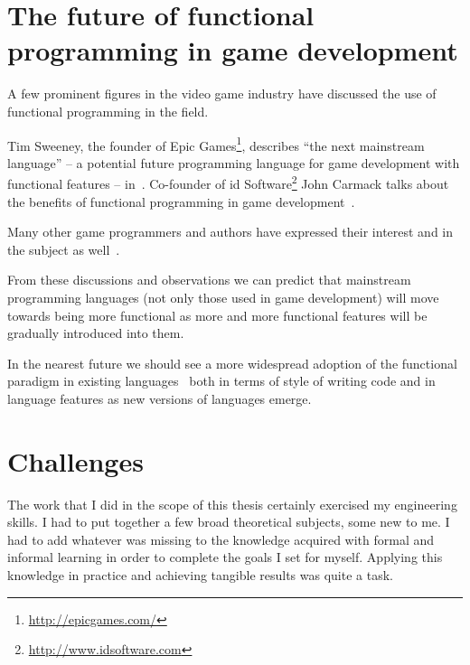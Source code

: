 \section{The future of functional programming in game development}
A few prominent figures in the video game industry have discussed the use of functional programming in the field.

Tim Sweeney, the founder of Epic Games\footnote{\url{http://epicgames.com/}}, describes ``the next mainstream language'' -- a potential future programming language for game development with functional features -- in~\cite{sweeney}. Co-founder of id Software\footnote{\url{http://www.idsoftware.com}} John Carmack talks about the benefits of functional programming in game development~\cite{carmack_cpp, carmack_keynote, carmack_keynote2}. 

Many other game programmers and authors have expressed their interest and in the subject as well~\cite{aversa, hague1}.

From these discussions and observations we can predict that mainstream programming languages (not only those used in game development) will move towards being more functional as more and more functional features will be gradually introduced into them.

In the nearest future we should see a more widespread adoption of the functional paradigm in existing languages~\cite{carmack_cpp} both in terms of style of writing code and in language features as new versions of languages emerge.

\section{Challenges}
The work that I did in the scope of this thesis certainly exercised my engineering skills. I had to put together a few broad theoretical subjects, some new to me. I had to add whatever was missing to the knowledge acquired with formal and informal learning in order to complete the goals I set for myself. Applying this knowledge in practice and achieving tangible results was quite a task.

